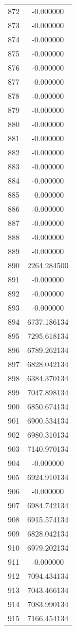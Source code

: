 \documentclass[12pt]{article}
\begin{document}
\begin{longtable}{@{}cc@{}}
872 & -0.000000 \\
873 & -0.000000 \\
874 & -0.000000 \\
875 & -0.000000 \\
876 & -0.000000 \\
877 & -0.000000 \\
878 & -0.000000 \\
879 & -0.000000 \\
880 & -0.000000 \\
881 & -0.000000 \\
882 & -0.000000 \\
883 & -0.000000 \\
884 & -0.000000 \\
885 & -0.000000 \\
886 & -0.000000 \\
887 & -0.000000 \\
888 & -0.000000 \\
889 & -0.000000 \\
890 & 2264.284500 \\
891 & -0.000000 \\
892 & -0.000000 \\
893 & -0.000000 \\
894 & 6737.186134 \\
895 & 7295.618134 \\
896 & 6789.262134 \\
897 & 6828.042134 \\
898 & 6384.370134 \\
899 & 7047.898134 \\
900 & 6850.674134 \\
901 & 6900.534134 \\
902 & 6980.310134 \\
903 & 7140.970134 \\
904 & -0.000000 \\
905 & 6924.910134 \\
906 & -0.000000 \\
907 & 6984.742134 \\
908 & 6915.574134 \\
909 & 6828.042134 \\
910 & 6979.202134 \\
911 & -0.000000 \\
912 & 7094.434134 \\
913 & 7043.466134 \\
914 & 7083.990134 \\
915 & 7166.454134 \\

\end{longtable}
\end{document}
